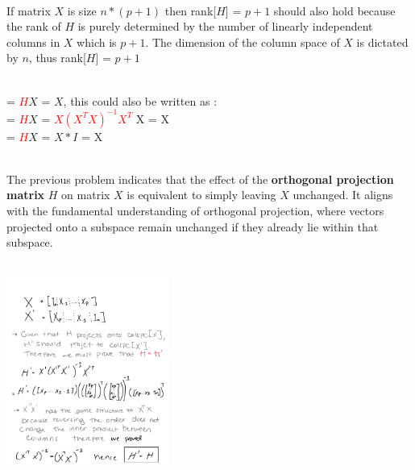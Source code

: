 \documentclass[12pt]{article}
\begin{document}

\begin{enumerate}

 \\

If matrix \( X\) is size \( n * (p + 1)\) then rank[\(H\)] = \(p + 1\) should also hold because the rank of \(H\) is purely determined by the number of linearly independent columns in \(X\) which is \(p + 1\). The dimension of the column space of \(X\) is dictated by \(n\), thus rank[\(H\)] = \(p + 1\)


 \\ 
= \textcolor{red}{\(H\)}\(X\) = \(X\), this could also be written as : \\
= \textcolor{red}{\(H\)}\(X\) = \textcolor{red}{\( X(X^T X)^{-1} X^T\)} X = X\\
= \textcolor{red}{\(H\)}\(X\) = \(X * I\) = X


 \\ 

The previous problem indicates that the effect of the \textbf{orthogonal projection matrix} \(H\) on matrix \(X\) is equivalent to simply leaving \(X\) unchanged. It aligns with the fundamental understanding of orthogonal projection, where vectors projected onto a subspace remain unchanged if they already lie within that subspace.

 \\
\includegraphics[width=0.4\textwidth]{2d.png}


\end{enumerate}
\end{document}
